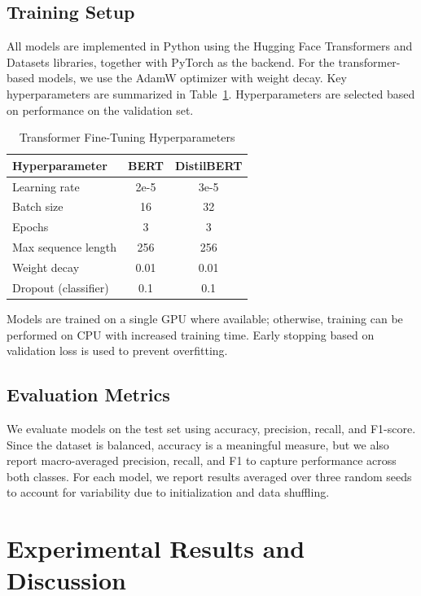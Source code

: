\documentclass[conference]{IEEEtran}
\begin{document}
\subsection{Training Setup}
All models are implemented in Python using the Hugging Face Transformers and Datasets libraries, together with PyTorch as the backend. For the transformer-based models, we use the AdamW optimizer with weight decay. Key hyperparameters are summarized in Table~\ref{tab:hyperparams}. Hyperparameters are selected based on performance on the validation set.

\begin{table}[htbp]
\caption{Transformer Fine-Tuning Hyperparameters}
\label{tab:hyperparams}
\centering
\begin{tabular}{lcc}
\toprule
\textbf{Hyperparameter} & \textbf{BERT} & \textbf{DistilBERT} \\
\midrule
Learning rate & 2e-5 & 3e-5 \\
Batch size & 16 & 32 \\
Epochs & 3 & 3 \\
Max sequence length & 256 & 256 \\
Weight decay & 0.01 & 0.01 \\
Dropout (classifier) & 0.1 & 0.1 \\
\bottomrule
\end{tabular}
\end{table}

Models are trained on a single GPU where available; otherwise, training can be performed on CPU with increased training time. Early stopping based on validation loss is used to prevent overfitting.

\subsection{Evaluation Metrics}
We evaluate models on the test set using accuracy, precision, recall, and F1-score. Since the dataset is balanced, accuracy is a meaningful measure, but we also report macro-averaged precision, recall, and F1 to capture performance across both classes. For each model, we report results averaged over three random seeds to account for variability due to initialization and data shuffling.

\section{Experimental Results and Discussion}
\label{sec:experiments}
\end{document}
